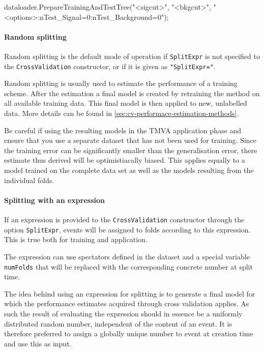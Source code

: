 \begin{codeexample}
\begin{tmvacode}
dataloader.PrepareTrainingAndTestTree("<sigcut>", "<bkgcut>",
   "<options>:nTest_Signal=0:nTest_Background=0");
\end{tmvacode}
\caption[.]{\codeexampleCaptionSize }
\label{code:cv-prepare-dataset}
\end{codeexample}

\paragraph{Random splitting}
Random splitting is the default mode of operation if \texttt{SplitExpr} is not specified to the \texttt{CrossValidation} constructor, or if it is given as \texttt{"SplitExpr="}.

Random splitting is usually used to estimate the performance of a training scheme. After the estimation a final model is created by retraining the method on all available training data. This final model is then applied to new, unlabelled data. More details can be found in \ref{sec:cv-performace-estimation-methods}.

Be careful if using the resulting models in the TMVA application phase and ensure that you use a separate dataset that has not been used for training. Since the training error can be significantly smaller than the generalisation error, there estimate thus derived will be optimistiacally biased. This applies equally to a model trained on the complete data set as well as the models resulting from the individual folds.

\paragraph{Splitting with an expression}
If an expression is provided to the \texttt{CrossValidation} constructor through the option \texttt{SplitExpr}, events will be assigned to folds according to this expression. This is true both for training and application.

The expression can use spectators defined in the dataset and a special variable \texttt{numFolds} that will be replaced with the corresponding concrete number at split time.

The idea behind using an expression for splitting is to generate a final model for which the performance estimates acquired through cross validation applies. As such the result of evaluating the expression should in essence be a uniformly distributed random number, independent of the content of an event. It is therefore preferred to assign a globally unique number to event at creation time and use this as input. 

